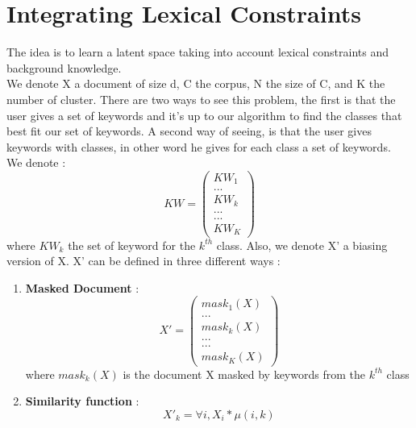 \section{Integrating Lexical Constraints}
The idea is to learn a latent space taking into account lexical constraints and
background knowledge.
\\We denote  X a document of size d,
C the corpus, N the size of C, and K the number of cluster.
There are two ways to see this problem, the first is that the user gives a set 
of keywords and it's up to our algorithm to find the classes that best fit our 
set of keywords. A second way of seeing, is that the user gives keywords with 
classes, in other word he gives for each class a set of keywords.\\
We denote :
\begin{equation}
KW = \begin{pmatrix}KW_1  \\ ... \\ KW_k \\ ...\\ ... \\ KW_{K}\end{pmatrix}
\end{equation}
where $KW_k$ the set of keyword for the $k^{th}$ class. Also, we denote X' a biasing
version of X. X' can be defined in three different ways :
\begin{enumerate}
\item \textbf{Masked Document} :
\begin{equation}
X' = \begin{pmatrix}mask_1(X)  \\ ... \\ mask_k(X) \\ ...\\ ... \\ mask_K(X)\end{pmatrix}
\end{equation}
where $mask_k(X)$ is the document X masked by keywords from the $k^{th}$ class
\item \textbf{Similarity function} :
\begin{equation}
   X'_k = \forall i, X_i * \mu(i,k) 
\end{equation}
\end{enumerate}
